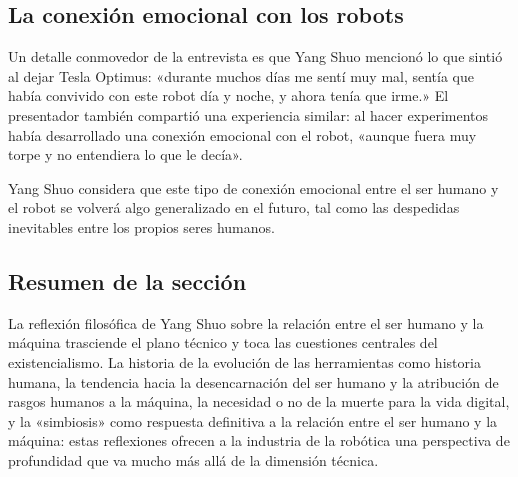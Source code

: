 \subsection{La conexión emocional con los robots}

Un detalle conmovedor de la entrevista es que Yang Shuo mencionó lo que sintió al dejar Tesla Optimus: «durante muchos días me sentí muy mal, sentía que había convivido con este robot día y noche, y ahora tenía que irme.» El presentador también compartió una experiencia similar: al hacer experimentos había desarrollado una conexión emocional con el robot, «aunque fuera muy torpe y no entendiera lo que le decía».

Yang Shuo considera que este tipo de conexión emocional entre el ser humano y el robot se volverá algo generalizado en el futuro, tal como las despedidas inevitables entre los propios seres humanos.

\subsection{Resumen de la sección}

La reflexión filosófica de Yang Shuo sobre la relación entre el ser humano y la máquina trasciende el plano técnico y toca las cuestiones centrales del existencialismo. La historia de la evolución de las herramientas como historia humana, la tendencia hacia la desencarnación del ser humano y la atribución de rasgos humanos a la máquina, la necesidad o no de la muerte para la vida digital, y la «simbiosis» como respuesta definitiva a la relación entre el ser humano y la máquina: estas reflexiones ofrecen a la industria de la robótica una perspectiva de profundidad que va mucho más allá de la dimensión técnica.

